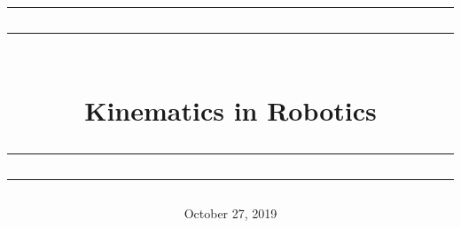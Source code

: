 \documentclass[12pt,a4paper]{article}
\newcommand\mymaketitle[1]{
   \rule{\textwidth}{1.6pt}\vspace*{-\baselineskip}\vspace*{2pt}
   \rule{\textwidth}{0.4pt}
   \\   
   \huge \bf #1\\
   \vspace{-8pt}
   \rule{\textwidth}{0.4pt}\vspace*{-\baselineskip}\vspace{3.2pt}
   \rule{\textwidth}{1.6pt}
}
\begin{document}
\title{
	\mymaketitle{Kinematics in Robotics}
}

\date{October 27, 2019}


\maketitle



%
%
\end{document}
